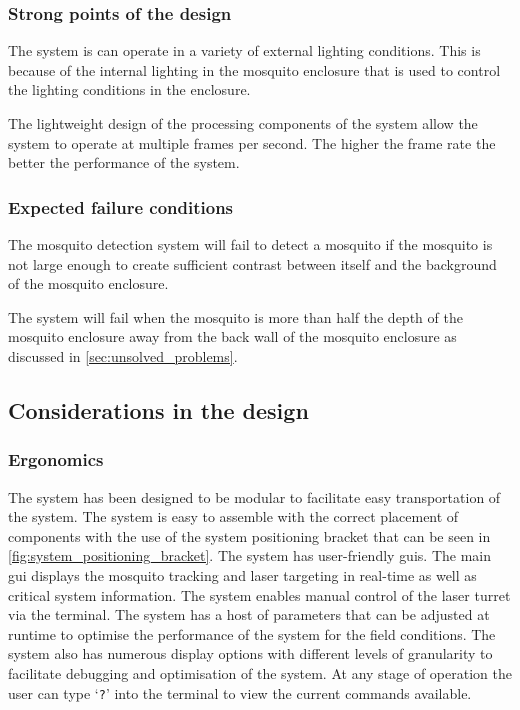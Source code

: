 \subsubsection{Strong points of the design}
The system is can operate in a variety of external lighting conditions. This is because of the internal lighting in the mosquito enclosure that is used to control the lighting conditions in the enclosure.

The lightweight design of the processing components of the system allow the system to operate at multiple frames per second. The higher the frame rate the better the performance of the system.

\subsubsection{Expected failure conditions}
The mosquito detection system will fail to detect a mosquito if the mosquito is not large enough to create sufficient contrast between itself and the background of the mosquito enclosure.

The system will fail when the mosquito is more than half the depth of the mosquito enclosure away from the back wall of the mosquito enclosure as discussed in \autoref{sec:unsolved_problems}.

\subsection{Considerations in the design}

\subsubsection{Ergonomics}
The system has been designed to be modular to facilitate easy transportation of the system. The system is easy to assemble with the correct placement of components with the use of the system positioning bracket that can be seen in \autoref{fig:system_positioning_bracket}. The system has user-friendly \glspl{gui}. The main \gls{gui} displays the mosquito tracking and laser targeting in real-time as well as critical system information. The system enables manual control of the laser turret via the terminal. The system has a host of parameters that can be adjusted at runtime to optimise the performance of the system for the field conditions. The system also has numerous display options with different levels of granularity to facilitate debugging and optimisation of the system. At any stage of operation the user can type `\texttt{?}' into the terminal to view the current commands available.

